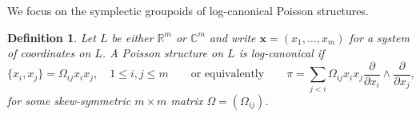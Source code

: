 \documentclass{amsart}
\newtheorem{definition}[theorem]{Definition}
\newtheorem{remark}[theorem]{Remark}
\newtheorem{example}[theorem]{Example}
\numberwithin{equation}{section}
\newcommand{\bfx}{{\boldsymbol{x}}}
\newcommand{\cO}{\mathcal{O}}
\newcommand{\CC}{\mathbb{C}}
\newcommand{\RR}{\mathbb{R}}
\begin{document}


We focus on the symplectic groupoids of log-canonical Poisson structures.
\begin{definition} 
  \label{def: logPoisson}
  Let $L$ be either $\RR^m$ or $\CC^m$ and write $\bfx = (x_1, \ldots, x_m)$ for a system of coordinates on $L$.
  A Poisson structure on $L$ is \emph{log-canonical} if
  $$
    \{x_i, x_j\} = \Omega_{ij} x_ix_j, \quad 1 \leq i,j \leq m \qquad \text{or equivalently} \qquad
    \pi = \sum_{j < i} \Omega_{ij} x_ix_j\frac{\partial}{\partial x_i} \wedge \frac{\partial}{\partial x_j},
  $$
  for some skew-symmetric $m\times m$ matrix $\Omega = (\Omega_{ij})$.
\end{definition}
\end{document}
